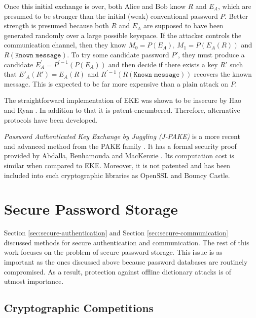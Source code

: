 Once this initial exchange is over, both Alice and Bob know \(R\) and \(E_A\), which are presumed to be stronger than the initial (weak) conventional password \(P\). Better strength is presumed because both \(R\) and \(E_A\) are supposed to have been generated randomly over a large possible keyspace. If the attacker controls the communication channel, then they know \(M_0 = P(E_A)\), \(M_1 = P(E_A(R))\) and \(R(\texttt{Known message})\). To try some candidate password \(P'\), they must produce a candidate \(E_A^{'} = P^{'-1}(P(E_A))\) and then decide if there exists a key \(R'\) such that \(E'_A(R') = E_A(R)\) and \(R^{'-1}(R(\texttt{Known message}))\) recovers the known message. This is expected to be far more expensive than a plain attack on \(P\).

The straightforward implementation of EKE was shown to be insecure by Hao and Ryan \cite{hao2010j}. In addition to that it is patent-encumbered. Therefore, alternative protocols have been developed.

\emph{Password Authenticated Key Exchange by Juggling (J-PAKE)} is a more recent and advanced method from the PAKE family \cite{hao2010j}. It has a formal security proof provided by Abdalla, Benhamouda and MacKenzie \cite{abdalla2015security}. Its computation cost is similar when compared to EKE. Moreover, it is not patented and has been included into such cryptographic libraries as OpenSSL and Bouncy Castle.

\section{Secure Password Storage}
\label{sec:secure-password-storage}

Section \ref{sec:secure-authentication} and Section \ref{sec:secure-communication} discussed methods for secure authentication and communication. The rest of this work focuses on the problem of secure password storage. This issue is as important as the ones discussed above because password databases are routinely compromised. As a result, protection against offline dictionary attacks is of utmost importance.

\subsection{Cryptographic Competitions}
\label{sec:cryptocomps}

